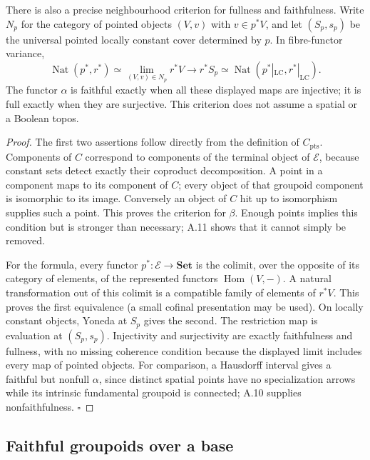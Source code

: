 There is also a precise neighbourhood criterion for fullness and faithfulness. Write $N_p$ for the category of pointed objects $(V,v)$ with $v\in p^*V$, and let $(S_p,s_p)$ be the universal pointed locally constant cover determined by $p$. In fibre-functor variance,
\[
 \operatorname{Nat}(p^*,r^*)
  \simeq\lim_{(V,v)\in N_p}r^*V
  \longrightarrow r^*S_p
  \simeq\operatorname{Nat}(p^*|_{\mathrm{LC}},r^*|_{\mathrm{LC}}).
\]
The functor $\alpha$ is faithful exactly when all these displayed maps are injective; it is full exactly when they are surjective. This criterion does not assume a spatial or a Boolean topos.
\begin{proof}
The first two assertions follow directly from the definition of $C_{\mathrm{pts}}$. Components of $C$ correspond to components of the terminal object of $\mathcal E$, because constant sets detect exactly their coproduct decomposition. A point in a component maps to its component of $C$; every object of that groupoid component is isomorphic to its image. Conversely an object of $C$ hit up to isomorphism supplies such a point. This proves the criterion for $\beta$. Enough points implies this condition but is stronger than necessary; A.11 shows that it cannot simply be removed.

For the formula, every functor $p^*:\mathcal E\to\mathbf{Set}$ is the colimit, over the opposite of its category of elements, of the represented functors $\operatorname{Hom}(V,-)$. A natural transformation out of this colimit is a compatible family of elements of $r^*V$. This proves the first equivalence (a small cofinal presentation may be used). On locally constant objects, Yoneda at $S_p$ gives the second. The restriction map is evaluation at $(S_p,s_p)$. Injectivity and surjectivity are exactly faithfulness and fullness, with no missing coherence condition because the displayed limit includes every map of pointed objects. For comparison, a Hausdorff interval gives a faithful but nonfull $\alpha$, since distinct spatial points have no specialization arrows while its intrinsic fundamental groupoid is connected; A.10 supplies nonfaithfulness. \hfill$\square$
\end{proof}

\subsection{Faithful groupoids over a base}

